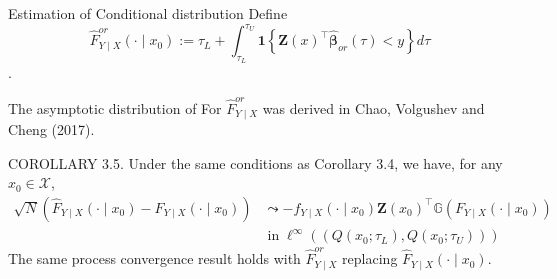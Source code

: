 \documentclass[11pt]{beamer}
\begin{document}
\begin{frame}{Estimation of Conditional distribution}
Define
$$
\widehat{F}_{Y \mid X}^{o r}\left(\cdot \mid x_{0}\right):=\tau_{L}+\int_{\tau_{L}}^{\tau_{U}} \mathbf{1}\left\{\mathbf{Z}(x)^{\top} \widehat{\boldsymbol{\beta}}_{o r}(\tau)<y\right\} d \tau
$$.

The asymptotic distribution of For 
$\widehat{F}_{Y \mid X}^{o r}$ was derived in Chao, Volgushev and
Cheng (2017).
\end{frame}
\begin{frame}{COROLLARY 3.5.}
Under the same conditions as Corollary 3.4, we have, for
any $x_0\in\mathcal{X}$,
$$
\begin{aligned}
\sqrt{N}\left(\widehat{F}_{Y \mid X}\left(\cdot \mid x_{0}\right)-F_{Y \mid X}\left(\cdot \mid x_{0}\right)\right) &\leadsto-f_{Y \mid X}\left(\cdot \mid x_{0}\right) \mathbf{Z}\left(x_{0}\right)^{\top} \mathbb{G}\left(F_{Y \mid X}\left(\cdot \mid x_{0}\right)\right) \\
& \operatorname{in} \ell^{\infty}\left(\left(Q\left(x_{0} ; \tau_{L}\right), Q\left(x_{0} ; \tau_{U}\right)\right)\right)
\end{aligned}
$$
The same process convergence result holds with $\widehat{F}_{Y \mid X}^{o r}$ replacing $\widehat{F}_{Y \mid X}\left(\cdot \mid x_{0}\right)$.
\end{frame}
\end{document}
